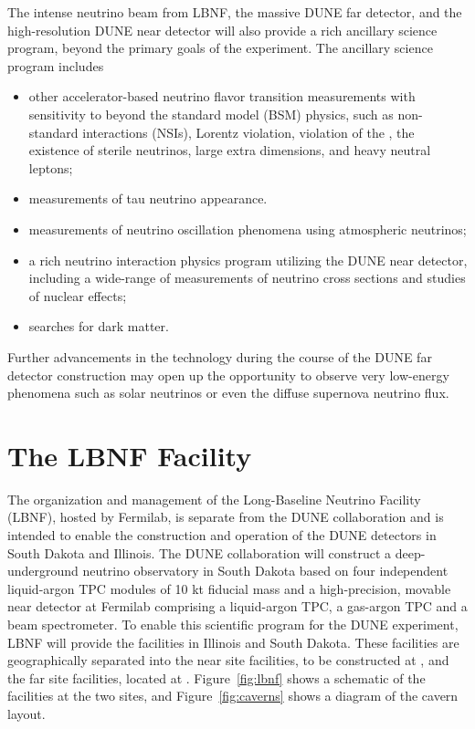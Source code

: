 The intense neutrino beam from LBNF, the massive DUNE \lartpc far detector, and the high-resolution
DUNE near detector will also provide a rich ancillary science program, beyond the primary goals of the experiment. The ancillary science program includes
\begin{itemize}
     \item other accelerator-based neutrino flavor transition measurements with sensitivity to beyond the standard model (BSM) physics, such as non-standard interactions (NSIs), Lorentz violation,  violation of the , the existence of sterile neutrinos, large extra dimensions, and heavy neutral leptons;
     \item measurements of tau neutrino appearance.
     \item measurements of neutrino oscillation phenomena using atmospheric neutrinos;
     \item a rich neutrino interaction physics program utilizing the DUNE near detector, including a wide-range of measurements of neutrino cross sections and studies of nuclear effects; %
     \item  searches for dark matter.
\end{itemize} 
Further advancements in the \lartpc %
technology during the course of the DUNE far detector construction may open up the opportunity
to observe very low-energy phenomena such as solar neutrinos or even the diffuse supernova neutrino flux.


\section{The LBNF Facility} 

The organization and management of the Long-Baseline Neutrino
Facility (LBNF), hosted by Fermilab, is separate from the DUNE collaboration and is intended to enable the construction and operation of the DUNE detectors in South Dakota and Illinois.
The DUNE collaboration will construct a deep-underground neutrino observatory in South Dakota based on four independent liquid-argon TPC modules of 10 kt fiducial mass
and a high-precision, movable near detector at Fermilab comprising a liquid-argon TPC, a gas-argon TPC and a beam spectrometer. 
To enable this scientific program for the DUNE experiment,
LBNF will provide the facilities in Illinois and South Dakota.
These facilities are geographically separated into the near site facilities, to be constructed
at \fnal, and the far site facilities, located at \surf. Figure~\ref{fig:lbnf} shows
a schematic of the facilities at the two sites, and Figure~\ref{fig:caverns} shows a diagram of the cavern layout. 

